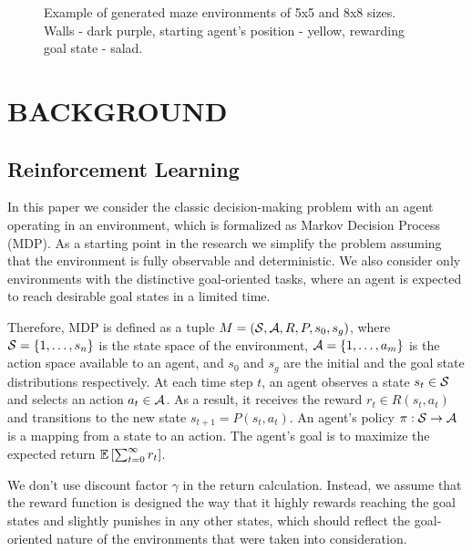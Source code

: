 \documentclass[a4paper,twoside]{article}
\begin{document}
\begin{figure}
  \centering
  \begin{minipage}{.49\linewidth}
    
  \end{minipage}
  \begin{minipage}{.49\linewidth}
    
  \end{minipage}
  \caption{Example of generated maze environments of 5x5 and 8x8 sizes. Walls - dark purple, starting agent's position - yellow, rewarding goal state - salad.} \label{fig_maze_examples}
\end{figure}

\section{\uppercase{Background}}

\subsection{Reinforcement Learning}

In this paper we consider the classic decision-making problem with an agent operating in an environment, which is formalized as Markov Decision Process (MDP). As a starting point in the research we simplify the problem assuming that the environment is fully observable and deterministic. We also consider only environments with the distinctive goal-oriented tasks, where an agent is expected to reach desirable goal states in a limited time.

Therefore, MDP is defined as a tuple $M = (\mathcal{S}, \mathcal{A}, R, P, s_0, s_g)$, where $\mathcal{S} = \{1, \dots, s_n\}$ is the state space of the environment, $\mathcal{A} = \{1, \dots, a_m\}$ is the action space available to an agent, and $s_0$ and $s_g$ are the initial and the goal state distributions respectively. At each time step $t$, an agent observes a state $s_t \in \mathcal{S}$ and selects an action $a_t \in \mathcal{A}$. As a result, it receives the reward $r_t \in R(s_t, a_t)$ and transitions to the new state $s_{t+1} = P(s_t, a_t)$. An agent's policy $\pi: \mathcal{S} \rightarrow \mathcal{A}$ is a mapping from a state to an action. The agent's goal is to maximize the expected return $\mathbb{E} \left[ \sum_{t=0}^{\infty} r_t \right]$. 

We don't use discount factor $\gamma$ in the return calculation. Instead, we assume that the reward function is designed the way that it highly rewards reaching the goal states and slightly punishes in any other states, which should reflect the goal-oriented nature of the environments that were taken into consideration.
\end{document}
